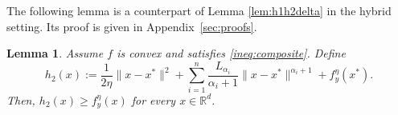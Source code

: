 \documentclass[11pt,letterpaper]{article}
\newtheorem{lemma}[thm]{Lemma}
\newcommand{\R}{\mathbb{R}}
\newcommand{\tx}{\tilde x}
\begin{document}

The following lemma is a counterpart of Lemma \ref{lem:h1h2delta} in the hybrid setting. Its proof is given in Appendix~\ref{sec:proofs}.

\begin{lemma}\label{lem:composite}
Assume $f$ is convex and satisfies \eqref{ineq:composite}.
Define 
\begin{equation}\label{def:h2-hybrid}
h_2(x) := \frac{1}{2\eta} \|x-x^*\|^2 + \sum_{i=1}^n \frac{L_{\alpha_i}}{\alpha_i+1} \|x-x^*\|^{\alpha_i+1} + f_y^{\eta}(x^*).
\end{equation}
Then, $h_2(x)\ge f_y^\eta(x)$ for every $x\in \R^d$.
\end{lemma}


\end{document}
